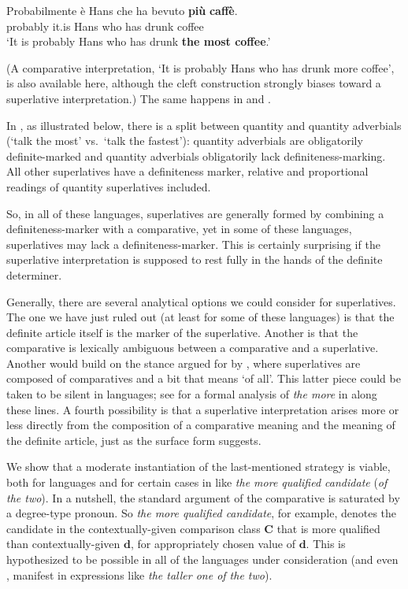\documentclass[output=paper
,modfonts
,nonflat]{langsci/langscibook}
\begin{document}
\ea \label{ex:coppockstrand:6}
\gll Probabilmente è Hans che ha bevuto \textbf{più} \textbf{caffè}.\\
probably it.is Hans who has drunk \cmpr{} coffee\\ 
\glt `It is probably Hans who has drunk \textbf{the most coffee}.'
\z

(A comparative interpretation, `It is probably Hans who has drunk more coffee', is also available here, although the cleft construction strongly biases toward a superlative interpretation.) The same happens in  and .

In , as illustrated below, there is a split between quantity and quantity adverbials (`talk the most' vs.\ `talk the fastest'): quantity adverbials are obligatorily definite-marked and quantity adverbials obligatorily lack definiteness-marking. All other superlatives have a definiteness marker, relative and proportional readings of quantity superlatives included.

So, in all of these languages, superlatives are generally formed by combining a definiteness-marker with a comparative, yet in some of these languages, superlatives may lack a definiteness-marker. 
This is certainly surprising if the superlative interpretation is supposed to rest fully in the hands of the definite determiner. 

Generally, there are several analytical options we could consider for  superlatives. The one we have just ruled out (at least for some of these languages) is that the definite article itself is the marker of the superlative. Another is that the comparative is lexically ambiguous between a comparative and a superlative. Another would build on the stance argued for by \citet{Bobaljik2012}, where superlatives are composed of comparatives and a bit that means `of all'. This latter piece could be taken to be silent in  languages; see \citet{Szabolcsi2012} for a formal analysis of \textit{the more} in  along these lines. A fourth possibility is that a superlative interpretation arises more or less directly from the composition of a comparative meaning and the meaning of the definite article, just as the surface form suggests.

We show that a moderate instantiation of the last-mentioned strategy is viable, both for  languages and for certain cases in  like \textit{the more qualified candidate} (\textit{of the two}). In a nutshell, the standard argument of the comparative is saturated by a degree-type pronoun. So \textit{the more qualified candidate}, for example, denotes the candidate in the contextually-given comparison class $\textbf{C}$ that is more qualified than contextually-given $\textbf{d}$, for appropriately chosen value of $\textbf{d}$. This is hypothesized to be possible in all of the languages under consideration (and even , manifest in expressions like \textit{the taller one of the two}).
\end{document}
